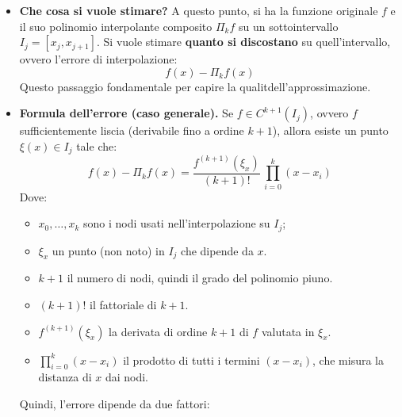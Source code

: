 \begin{itemize}
\begin{takeawaysbox}
\begin{itemize}
\begin{enumerate}
                \begin{itemize}
                    \item[\textcolor{Green3}{\faIcon{question-circle}}] \textcolor{Green3}{\textbf{Che cosa si vuole stimare?}} A questo punto, si ha la funzione originale $f$ e il suo polinomio interpolante composito $\Pi_{k} f$ su un sottointervallo $I_{j} = [x_{j}, x_{j+1}]$. Si vuole stimare \textbf{quanto si discostano} su quell'intervallo, ovvero l'errore di interpolazione:
                    \begin{equation*}
                        f(x)-\Pi_k f(x)
                    \end{equation*}
                    Questo passaggio \eaccent fondamentale per capire la qualit\aaccent dell'approssimazione.
                    \item[\textcolor{Green3}{\faIcon{question-circle}}] \textcolor{Green3}{\textbf{Formula dell'errore (caso generale).}} Se $f \in C^{k+1}(I_{j})$, ovvero $f$ \eaccent sufficientemente liscia (derivabile fino a ordine $k+1$), allora esiste un punto $\xi(x) \in I_{j}$ tale che:
                    \begin{equation*}
                        f(x) - \Pi_k f(x) = \dfrac{f^{(k+1)}(\xi_x)}{(k+1)!} \, \prod_{i=0}^{k} (x - x_{i})
                    \end{equation*}
                    Dove:
                    \begin{itemize}
                        \item $x_{0}, \dots, x_{k}$ sono i nodi usati nell'interpolazione su $I_{j}$;
                        \item $\xi_{x}$ \eaccent un punto (non noto) in $I_{j}$ che dipende da $x$.
                        \item $k+1$ \eaccent il numero di nodi, quindi il grado del polinomio pi\uaccent uno.
                        \item $(k+1)!$ \eaccent il fattoriale di $k+1$.
                        \item $f^{(k+1)}(\xi_{x})$ \eaccent la derivata di ordine $k+1$ di $f$ valutata in $\xi_{x}$.
                        \item $\prod_{i=0}^{k} (x - x_{i})$ \eaccent il prodotto di tutti i termini $(x - x_{i})$, che misura la distanza di $x$ dai nodi.
                    \end{itemize}
                    Quindi, l'errore dipende da due fattori:
                    \begin{enumerate}

\end{enumerate}
\end{itemize}
\end{enumerate}
\end{itemize}
\end{takeawaysbox}
\end{itemize}
